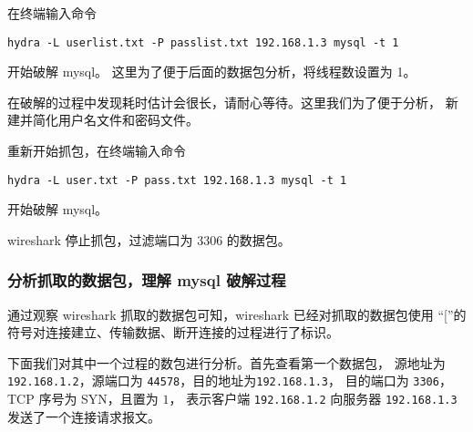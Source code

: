 在终端输入命令
\begin{verbatim}
hydra -L userlist.txt -P passlist.txt 192.168.1.3 mysql -t 1
\end{verbatim}
开始破解 mysql。
这里为了便于后面的数据包分析，将线程数设置为 1。

在破解的过程中发现耗时估计会很长，请耐心等待。这里我们为了便于分析，
新建并简化用户名文件和密码文件。

重新开始抓包，在终端输入命令
\begin{verbatim}
hydra -L user.txt -P pass.txt 192.168.1.3 mysql -t 1
\end{verbatim}
开始破解 mysql。

wireshark 停止抓包，过滤端口为 3306 的数据包。
%
\subsubsection{分析抓取的数据包，理解 mysql 破解过程}
通过观察 wireshark 抓取的数据包可知，wireshark 已经对抓取的数据包使用
``[''的符号对连接建立、传输数据、断开连接的过程进行了标识。

下面我们对其中一个过程的数包进行分析。首先查看第一个数据包，
源地址为 \texttt{192.168.1.2}，源端口为 \texttt{44578}，目的地址为\texttt{192.168.1.3}，
目的端口为 \texttt{3306}，TCP 序号为 SYN，且置为 $1$，
表示客户端 \texttt{192.168.1.2} 向服务器 \texttt{192.168.1.3} 发送了一个连接请求报文。

